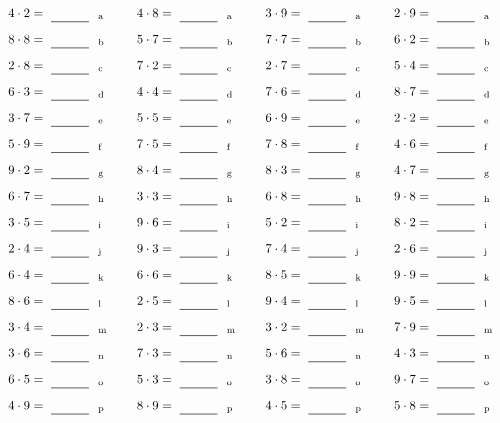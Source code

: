 \documentclass
[
  draft    = true,
  fontsize = 11pt,
  parskip  = half-
]
{scrartcl}
\begin{document}
\par\vfill\par
\begin{align*}
    \pline{4\cdot2}&=\rline{a}
  & \pline{4\cdot8}&=\rline{a}
  & \pline{3\cdot9}&=\rline{a}
  & \pline{2\cdot9}&=\rline{a} \\[1ex]
    \pline{8\cdot8}&=\rline{b}
  & \pline{5\cdot7}&=\rline{b}
  & \pline{7\cdot7}&=\rline{b}
  & \pline{6\cdot2}&=\rline{b} \\[1ex]
    \pline{2\cdot8}&=\rline{c}
  & \pline{7\cdot2}&=\rline{c}
  & \pline{2\cdot7}&=\rline{c}
  & \pline{5\cdot4}&=\rline{c} \\[1ex]
    \pline{6\cdot3}&=\rline{d}
  & \pline{4\cdot4}&=\rline{d}
  & \pline{7\cdot6}&=\rline{d}
  & \pline{8\cdot7}&=\rline{d} \\[1ex]
    \pline{3\cdot7}&=\rline{e}
  & \pline{5\cdot5}&=\rline{e}
  & \pline{6\cdot9}&=\rline{e}
  & \pline{2\cdot2}&=\rline{e} \\[1ex]
    \pline{5\cdot9}&=\rline{f}
  & \pline{7\cdot5}&=\rline{f}
  & \pline{7\cdot8}&=\rline{f}
  & \pline{4\cdot6}&=\rline{f} \\[1ex]
    \pline{9\cdot2}&=\rline{g}
  & \pline{8\cdot4}&=\rline{g}
  & \pline{8\cdot3}&=\rline{g}
  & \pline{4\cdot7}&=\rline{g} \\[1ex]
    \pline{6\cdot7}&=\rline{h}
  & \pline{3\cdot3}&=\rline{h}
  & \pline{6\cdot8}&=\rline{h}
  & \pline{9\cdot8}&=\rline{h} \\[1ex]
    \pline{3\cdot5}&=\rline{i}
  & \pline{9\cdot6}&=\rline{i}
  & \pline{5\cdot2}&=\rline{i}
  & \pline{8\cdot2}&=\rline{i} \\[1ex]
    \pline{2\cdot4}&=\rline{j}
  & \pline{9\cdot3}&=\rline{j}
  & \pline{7\cdot4}&=\rline{j}
  & \pline{2\cdot6}&=\rline{j} \\[1ex]
    \pline{6\cdot4}&=\rline{k}
  & \pline{6\cdot6}&=\rline{k}
  & \pline{8\cdot5}&=\rline{k}
  & \pline{9\cdot9}&=\rline{k} \\[1ex]
    \pline{8\cdot6}&=\rline{l}
  & \pline{2\cdot5}&=\rline{l}
  & \pline{9\cdot4}&=\rline{l}
  & \pline{9\cdot5}&=\rline{l} \\[1ex]
    \pline{3\cdot4}&=\rline{m}
  & \pline{2\cdot3}&=\rline{m}
  & \pline{3\cdot2}&=\rline{m}
  & \pline{7\cdot9}&=\rline{m} \\[1ex]
    \pline{3\cdot6}&=\rline{n}
  & \pline{7\cdot3}&=\rline{n}
  & \pline{5\cdot6}&=\rline{n}
  & \pline{4\cdot3}&=\rline{n} \\[1ex]
    \pline{6\cdot5}&=\rline{o}
  & \pline{5\cdot3}&=\rline{o}
  & \pline{3\cdot8}&=\rline{o}
  & \pline{9\cdot7}&=\rline{o} \\[1ex]
    \pline{4\cdot9}&=\rline{p}
  & \pline{8\cdot9}&=\rline{p}
  & \pline{4\cdot5}&=\rline{p}
  & \pline{5\cdot8}&=\rline{p}
\end{align*}
\end{document}
